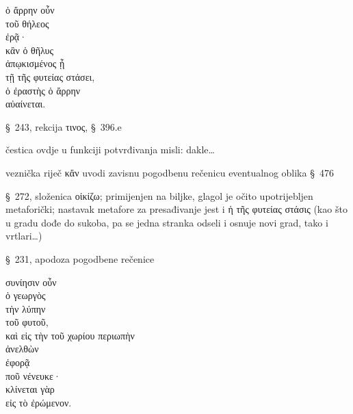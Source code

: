
{\large
\begin{greek}
\noindent ὁ ἄρρην οὖν \\
τοῦ θήλεος \\
ἐρᾷ·\\
κἂν ὁ θῆλυς \\
ἀπῳκισμένος ᾖ \\
\tabto{2em} τῇ τῆς φυτείας στάσει, \\
ὁ ἐραστὴς ὁ ἄρρην \\
αὐαίνεται.\\

\end{greek}
}

\begin{description}[noitemsep]
\item[ἐρᾷ] §~243, rekcija τινος, §~396.e
\item[οὖν] čestica ovdje u funkciji potvrđivanja misli: dakle\dots
\item[κἂν ἀπῳκισμένος ᾖ\dots] veznička riječ κἄν uvodi zavisnu pogodbenu rečenicu eventualnog oblika §~476
\item[ἀπῳκισμένος ᾖ] §~272, složenica οἰκίζω; primijenjen na biljke, glagol je očito upotrijebljen metaforički; nastavak metafore za presađivanje jest i \textgreek[variant=ancient]{ἡ τῆς φυτείας στάσις} (kao što u gradu dođe do sukoba, pa se jedna stranka odseli i osnuje novi grad, tako i vrtlari\dots)
\item[αὐαίνεται] §~231, apodoza pogodbene rečenice

\end{description}


{\large
\begin{greek}
\noindent συνίησιν οὖν \\
ὁ γεωργὸς \\
τὴν λύπην \\
\tabto{2em} τοῦ φυτοῦ, \\
καὶ εἰς τὴν τοῦ χωρίου περιωπὴν \\
ἀνελθὼν \\
ἐφορᾷ \\
\tabto{2em} ποῦ νένευκε· \\
κλίνεται γὰρ \\
\tabto{2em} εἰς τὸ ἐρώμενον.\\

\end{greek}
}

